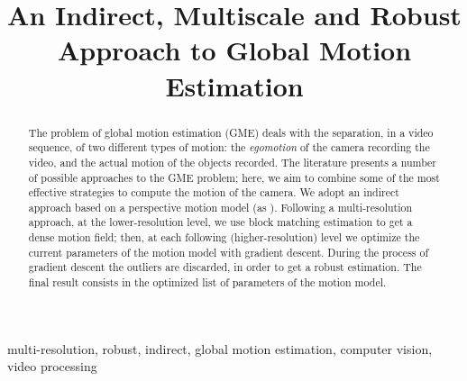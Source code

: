 \documentclass[conference]{IEEEtran}
\begin{document}
\title{An Indirect, Multiscale and Robust Approach to Global Motion Estimation}

\author{
\and
{}
}

\maketitle

\thispagestyle{plain}
\pagestyle{plain}

\begin{abstract}
The problem of global motion estimation (GME) deals with the separation, in a video sequence, of two different types of motion: the \emph{egomotion} of the camera recording the video, and the actual motion of the objects recorded. The literature presents a number of possible approaches to the GME problem; here, we aim to combine some of the most effective strategies to compute the motion of the camera. We adopt an indirect approach based on a perspective motion model (as \cite{Dufeaux2000}). Following a multi-resolution approach, at the lower-resolution level, we use block matching estimation to get a dense motion field; then, at each following (higher-resolution) level we optimize the current parameters of the motion model with gradient descent. During the process of gradient descent the outliers are discarded, in order to get a robust estimation. The final result consists in the optimized list of parameters of the motion model.  
\end{abstract}

\begin{IEEEkeywords}
multi-resolution, robust, indirect, global motion estimation, computer vision, video processing
\end{IEEEkeywords}







{}

\end{document}
